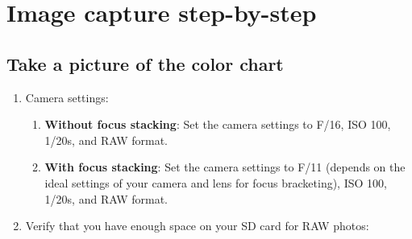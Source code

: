 \documentclass[
]{book}
\providecommand{\tightlist}{%
  \setlength{\itemsep}{0pt}\setlength{\parskip}{0pt}}
\begin{document}
\hypertarget{image-capture-step-by-step}{%
\chapter{Image capture step-by-step}\label{image-capture-step-by-step}}

\hypertarget{take-a-picture-of-the-color-chart}{%
\section{Take a picture of the color chart}\label{take-a-picture-of-the-color-chart}}

\begin{enumerate}
\def\labelenumi{\arabic{enumi}.}
\item
  Camera settings:

  \begin{enumerate}
  \def\labelenumii{\alph{enumii}.}
  \tightlist
  \item
    \textbf{Without focus stacking}: Set the camera settings to F/16, ISO 100,
    1/20s, and RAW format.
  \item
    \textbf{With focus stacking}: Set the camera settings to F/11 (depends on
    the ideal settings of your camera and lens for focus bracketing), ISO
    100, 1/20s, and RAW format.
  \end{enumerate}
\item
  Verify that you have enough space on your SD card for RAW photos:


\end{enumerate}
\end{document}
